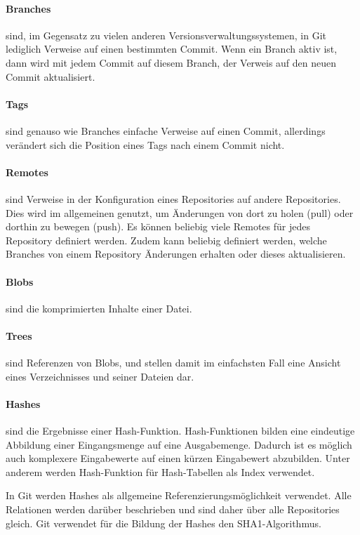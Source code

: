 \paragraph{Branches} sind, im Gegensatz zu vielen anderen Versionsverwaltungssystemen, in Git lediglich Verweise auf einen 
bestimmten Commit. Wenn ein Branch aktiv ist, dann wird mit jedem Commit auf diesem Branch, der Verweis auf den neuen 
Commit aktualisiert.

\paragraph{Tags} sind genauso wie Branches einfache Verweise auf einen Commit, allerdings verändert sich die Position 
eines Tags nach einem Commit nicht.

\paragraph{Remotes} sind Verweise in der Konfiguration eines Repositories auf andere Repositories. Dies wird im 
allgemeinen genutzt, um Änderungen von dort zu holen (pull) oder dorthin zu bewegen (push). Es können beliebig viele Remotes für jedes 
Repository definiert werden. Zudem kann beliebig definiert werden, welche Branches von einem Repository Änderungen 
erhalten oder dieses aktualisieren.

\paragraph{Blobs} sind die komprimierten Inhalte einer Datei.

\paragraph{Trees} sind Referenzen von Blobs, und stellen damit im einfachsten Fall eine Ansicht eines Verzeichnisses und 
seiner Dateien dar.

\paragraph{Hashes} sind die Ergebnisse einer Hash-Funktion. Hash-Funktionen bilden eine eindeutige Abbildung einer Eingangsmenge auf eine Ausgabemenge. Dadurch ist es möglich auch komplexere Eingabewerte auf einen kürzen Eingabewert abzubilden. Unter anderem werden Hash-Funktion für Hash-Tabellen als Index verwendet. 

In Git werden Hashes als allgemeine Referenzierungsmöglichkeit verwendet. Alle Relationen werden darüber beschrieben und sind daher über alle Repositories gleich. Git verwendet für die Bildung der Hashes den SHA1-Algorithmus. 

